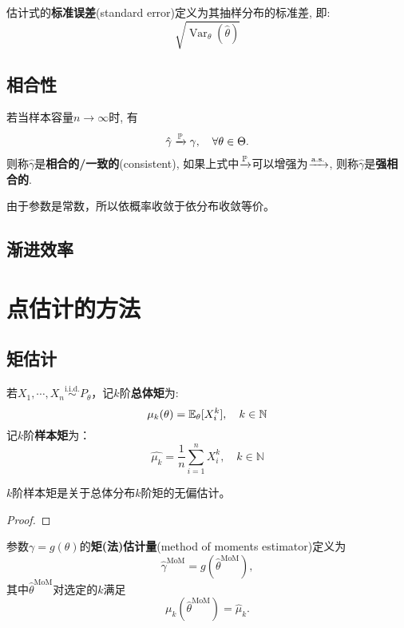 \begin{definition}[标准误差]
    估计式的\textbf{标准误差}(standard error)定义为其抽样分布的标准差, 即:
    \[ \sqrt{\operatorname{Var}_{\theta}(\hat{\theta})} \]
\end{definition}

\subsection{相合性}

\begin{definition}[相合]
    若当样本容量$n\to\infty$时, 有
    \[ \hat{\gamma} \xrightarrow{\P} \gamma, \quad \forall \theta\in\Theta. \]
    则称$\hat{\gamma}$是\textbf{相合的/一致的}(consistent), 如果上式中$\xrightarrow{\P}$可以增强为$\xrightarrow{\as}$, 则称$\hat{\gamma}$是\textbf{强相合的}.
\end{definition}
\begin{remark}
    由于参数是常数，所以依概率收敛于依分布收敛等价。
\end{remark}

\subsection{渐进效率}

\section{点估计的方法}

\subsection{矩估计}

\begin{definition}[总体矩与样本矩]
    若$X_1,\cdots ,X_n \overset{\text{i.i.d.}}{\sim} P_{\theta}$，记$k$阶\textbf{总体矩}为:
    \[ \mu_k(\theta) = \E_{\theta}[X_i^k] ,\quad k \in \mathbb{N}\]
    记$k$阶\textbf{样本矩}为：
    \[ \hat{\mu_k}=\frac{1}{n}\sum_{i=1}^n X_i^k ,\quad k \in \mathbb{N}\]
\end{definition}

\begin{proposition}
    $k$阶样本矩是关于总体分布$k$阶矩的无偏估计。
\end{proposition}
\begin{proof}

\end{proof}

\begin{definition}[矩法估计量]
    参数$\gamma = g(\theta)$的\textbf{矩{\color{lightgray}(法)}估计量}(method of moments estimator)定义为
    \[ \hat{\gamma}^{\mathrm{MoM}} = g(\hat{\theta}^{\mathrm{MoM}}) , \]
    其中$\hat{\theta}^{\mathrm{MoM}}$对选定的$k$满足
    \[ \mu_{k}(\hat{\theta}^{\mathrm{MoM}}) = \hat{\mu}_{k} . \]
\end{definition}


